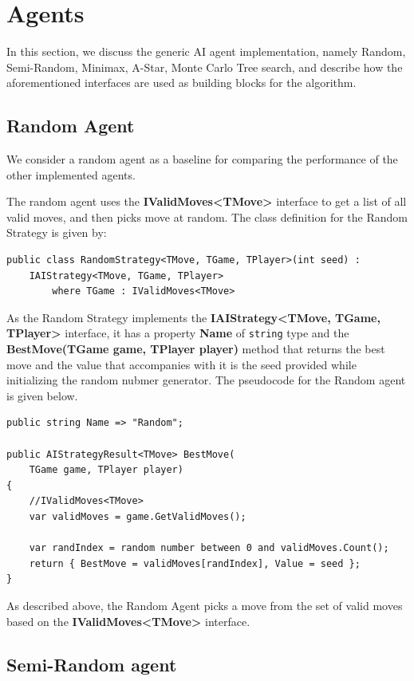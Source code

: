 \section{Agents}

In this section, we discuss the generic \gls{AI} agent implementation, namely Random, Semi-Random, Minimax, A-Star, Monte Carlo Tree search, and describe how the aforementioned interfaces are used as building blocks for the algorithm.

\subsection{Random Agent}
We consider a random agent as a baseline for comparing the performance of the other implemented agents. 

The random agent uses the \textbf{IValidMoves\textless{}TMove\textgreater{}} interface to get a list of all valid moves, and then picks move at random. The class definition for the Random Strategy is given by:
\begin{lstlisting}
public class RandomStrategy<TMove, TGame, TPlayer>(int seed) :
    IAIStrategy<TMove, TGame, TPlayer>
        where TGame : IValidMoves<TMove>
\end{lstlisting}

As the Random Strategy implements the \textbf{IAIStrategy\textless{}TMove, TGame, TPlayer\textgreater{}} interface, it has a property \textbf{Name} of \texttt{string} type and the \textbf{BestMove(TGame game, TPlayer player)} method that returns the best move and the value that accompanies with it is the seed provided while initializing the random nubmer generator. The pseudocode for the Random agent is given below.

\begin{lstlisting}   
public string Name => "Random";

public AIStrategyResult<TMove> BestMove(
    TGame game, TPlayer player)
{
    //IValidMoves<TMove>
    var validMoves = game.GetValidMoves();

    var randIndex = random number between 0 and validMoves.Count();
    return { BestMove = validMoves[randIndex], Value = seed };
}
\end{lstlisting}

As described above, the Random Agent picks a move from the set of valid moves based on the \textbf{IValidMoves\textless{}TMove\textgreater{}} interface.

\subsection{Semi-Random agent}

